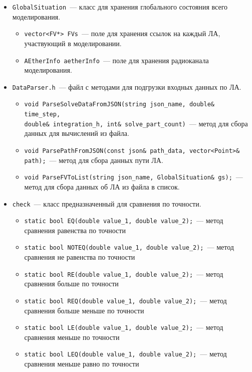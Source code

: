 \documentclass[a4paper,12pt]{article}
\numberwithin{figure}{subsubsection}
\begin{document}
\begin{itemize}
\begin{itemize}
    \end{itemize}
    \item \texttt{GlobalSituation}~--- класс для хранения глобального состояния всего моделирования.  
    \begin{itemize}
        \item \texttt{vector<FV*> FVs}~---  поле для хранения ссылок на каждый ЛА, участвующий в моделировании.
        \item \texttt{AEtherInfo aetherInfo}~--- поле для хранения радиоканала моделирования.
    \end{itemize}
    \item \texttt{DataParser.h}~--- файл с методами для подгрузки входных данных по ЛА.   
    \begin{itemize}
        \item \texttt{void ParseSolveDataFromJSON(string json\_name, double\& time\_step,\\ double\& integration\_h, int\& solve\_part\_count)}~--- метод для сбора данных для вычислений из файла.
        \item \texttt{void ParsePathFromJSON(const json\& path\_data, vector<Point>\& path);}~--- метод для сбора данных пути ЛА.
        \item \texttt{void ParseFVToList(string json\_name, GlobalSituation\& gs);}~--- метод для сбора данных об ЛА из файла в список.
    \end{itemize}
    \item \texttt{check}~--- класс предназначенный для сравнения по точности.   
    \begin{itemize}
        \item \texttt{static bool EQ(double value\_1, double value\_2);}~---  метод сравнения равенства по точности 
        \item \texttt{static bool NOTEQ(double value\_1, double value\_2);}~--- метод сравнения не равенства по точности
        \item \texttt{static bool RE(double value\_1, double value\_2);}~--- метод сравнения больше по точности
        \item \texttt{static bool REQ(double value\_1, double value\_2);}~--- метод сравнения больше меньше по точности
        \item \texttt{static bool LE(double value\_1, double value\_2);}~--- метод сравнения меньше по точности
        \item \texttt{static bool LEQ(double value\_1, double value\_2);}~--- метод сравнения меньше равно по точности
    \end{itemize}

\end{itemize}
\end{document}
